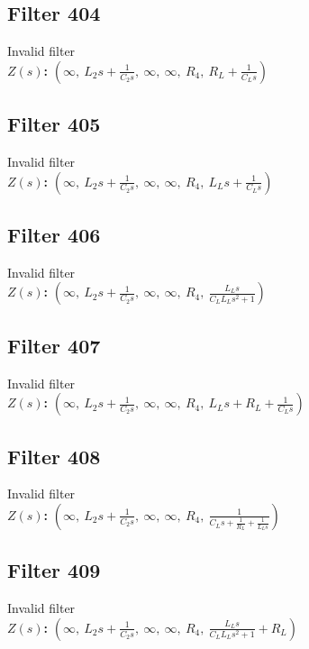 \documentclass{article}
\begin{document}
\subsection*{Filter 404}
Invalid filter \\ 
\textbf{$Z(s)$:} $\left( \infty, \  L_{2} s + \frac{1}{C_{2} s}, \  \infty, \  \infty, \  R_{4}, \  R_{L} + \frac{1}{C_{L} s}\right)$ \\ 
\subsection*{Filter 405}
Invalid filter \\ 
\textbf{$Z(s)$:} $\left( \infty, \  L_{2} s + \frac{1}{C_{2} s}, \  \infty, \  \infty, \  R_{4}, \  L_{L} s + \frac{1}{C_{L} s}\right)$ \\ 
\subsection*{Filter 406}
Invalid filter \\ 
\textbf{$Z(s)$:} $\left( \infty, \  L_{2} s + \frac{1}{C_{2} s}, \  \infty, \  \infty, \  R_{4}, \  \frac{L_{L} s}{C_{L} L_{L} s^{2} + 1}\right)$ \\ 
\subsection*{Filter 407}
Invalid filter \\ 
\textbf{$Z(s)$:} $\left( \infty, \  L_{2} s + \frac{1}{C_{2} s}, \  \infty, \  \infty, \  R_{4}, \  L_{L} s + R_{L} + \frac{1}{C_{L} s}\right)$ \\ 
\subsection*{Filter 408}
Invalid filter \\ 
\textbf{$Z(s)$:} $\left( \infty, \  L_{2} s + \frac{1}{C_{2} s}, \  \infty, \  \infty, \  R_{4}, \  \frac{1}{C_{L} s + \frac{1}{R_{L}} + \frac{1}{L_{L} s}}\right)$ \\ 
\subsection*{Filter 409}
Invalid filter \\ 
\textbf{$Z(s)$:} $\left( \infty, \  L_{2} s + \frac{1}{C_{2} s}, \  \infty, \  \infty, \  R_{4}, \  \frac{L_{L} s}{C_{L} L_{L} s^{2} + 1} + R_{L}\right)$ \\ 
\end{document}
